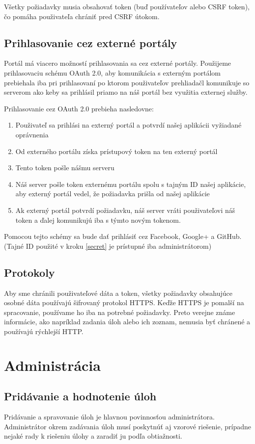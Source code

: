 Všetky požiadavky musia obsahovať token (buď používateľov alebo CSRF token),
čo pomáha použivateľa chrániť pred CSRF útokom.

\subsection{Prihlasovanie cez externé portály}
\label{oAuth}
Portál má viacero možností prihlasovania sa cez externé portály. Použijeme prihlasovaciu schému OAuth 2.0, aby komunikácia s externým
portálom prebiehala iba pri prihlasovaní po ktorom použivateľov prehliadačl komunikuje so serverom ako keby sa prihlásil priamo na náš portál bez využitia externej služby.

Prihlasovanie cez OAuth 2.0 prebieha nasledovne:
\begin{enumerate}
\item{Použivateľ sa prihlási na externý portál a potvrdí našej aplikácii vyžiadané oprávnenia}
\item{Od externého portálu získa prístupový token na ten externý portál}
\item \label{secret}{Tento token pošle nášmu serveru}
\item{Náš server pošle token externému portálu spolu s tajným ID našej aplikácie, aby externý portál vedel, že požiadavka prišla od našej aplikácie}
\item{Ak externý portál potvrdí požiadavku, náš server vráti použivateľovi náš token a ďalej komunikujú iba s týmto novým tokenom.}
\end{enumerate}

Pomocou tejto schémy sa bude dať prihlásiť cez Facebook, Google+ a GitHub.
\newline
(Tajné ID použité v kroku \ref{secret} je prístupné iba administrátorom)

\subsection{Protokoly}
Aby sme chránili použivateľové dáta a token, všetky požiadavky obsahujúce osobné dáta používajú šifrovaný protokol HTTPS. Keďže HTTPS je pomalší na spracovanie,
používame ho iba na potrebné požiadavky. Preto verejne známe informácie, ako napríklad zadania úloh alebo ich zoznam, nemusia byť chránené a používajú rýchlejší HTTP.
\section{Administrácia}
\subsection{Pridávanie a hodnotenie úloh}
Pridávanie a spravovanie úloh je hlavnou povinnosťou administrátora. Administrátor okrem zadávania úloh musí poskytnúť aj vzorové riešenie, prípadne nejaké rady k riešeniu úlohy a zaradiť ju podľa obtiažnosti.

